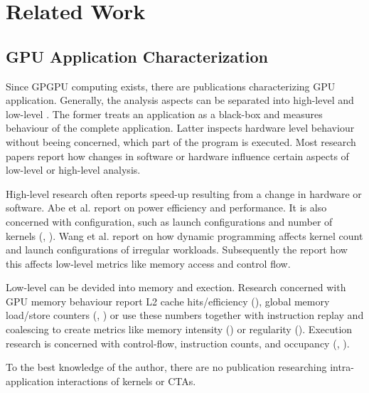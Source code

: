 \chapter{Related Work}
\section{GPU Application Characterization}
Since GPGPU computing exists, there are publications characterizing GPU application. Generally, the analysis
aspects can be separated into high-level and low-level . The former treats an application as a black-box
and measures behaviour of the complete application. Latter inspects hardware level behaviour without
beeing concerned, which part of the program is executed. Most research papers report how changes in software or hardware influence certain aspects of low-level or high-level analysis.

High-level research often reports speed-up resulting from a change in hardware or software. Abe et al. \cite{6877247} report on power efficiency and performance. 
It is also concerned with configuration, such as launch configurations and number of kernels (\cite{6983039}, \cite{Kerr:2009:CAP:1678998.1680778}). Wang et al. \cite{6983039} report on how dynamic programming affects kernel count and launch configurations of irregular workloads. Subsequently the report how this affects low-level metrics like memory access and control flow.

Low-level can be devided into memory and exection.
Research concerned with GPU memory behaviour report L2 cache hits/efficiency (\cite{microarch}), global memory load/store counters (\cite{microarch}, \cite{6983039}) or use these numbers together with instruction replay and coalescing to create metrics like memory intensity (\cite{Kerr:2009:CAP:1678998.1680778}) or regularity (\cite{Burtscher:2012:QSI:2473499.2474126}).  Execution research is concerned with control-flow, instruction counts, and occupancy (\cite{microarch}, \cite{Kerr:2009:CAP:1678998.1680778}).

To the best  knowledge of the author, there are no publication researching intra-application interactions of kernels or CTAs.
